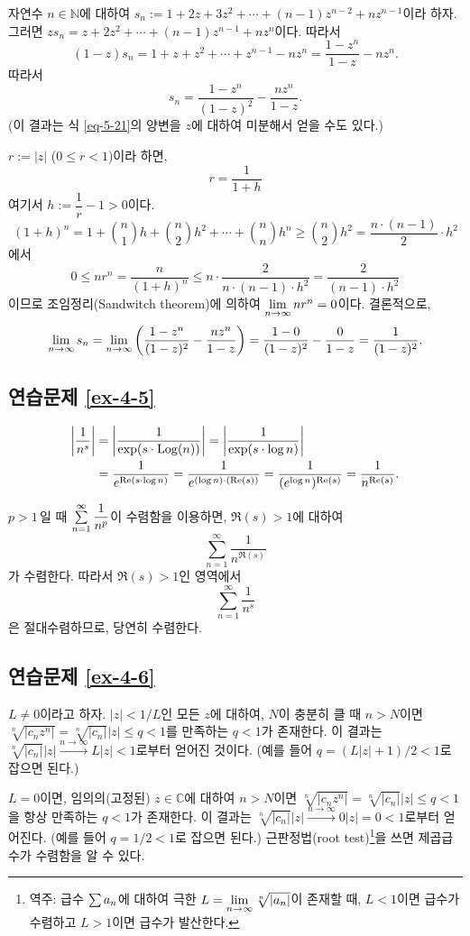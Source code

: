 자연수 $n\in\mathbb N$에 대하여 
$s_n:= 1+2z + 3z^2 + \cdots + (n-1)z^{n-2} + nz^{n-1}$이라 하자.
그러면 $zs_n = z + 2z^2 + \cdots + (n-1)z^{n-1} + nz^n$이다.
따라서
\[
(1-z)s_n= 1 + z + z^2 + \cdots + z^{n-1} - nz^n
= \dfrac{1-z^n}{1-z}  - nz^n.
\]
따라서
\[
s_n = \dfrac{1-z^n}{(1-z)^2}  - \dfrac{nz^n}{1-z}.
\]
(이 결과는 식 \eqref{eq-5-21}의 양변을 $z$에 대하여 미분해서 얻을 수도 있다.)

$r:=|z|$ ($0\le r < 1$)이라 하면,
\[
r = \dfrac1{1+h}
\]
여기서 $h:=\dfrac1r-1>0$이다.
\[
(1+h)^n = 1 + {n\choose 1}h + {n \choose 2}h^2 + \cdots
+ {n \choose n}h^n \ge {n \choose 2}h^2 = \dfrac{n\cdot(n-1)}2 \cdot h^2
\]
에서
\[
0\le nr^n = \dfrac n{(1+h)^n} \le n \cdot \dfrac2{n\cdot(n-1)\cdot h^2}
= \dfrac 2{(n-1)\cdot h^2}
\]
이므로
조임정리(Sandwitch theorem)에 의하여 $\lim\limits_{n\to\infty} nr^n = 0$이다.
결론적으로,
\[
\lim\limits_{n\to\infty}  s_n = \lim\limits_{n\to\infty} \left( \displaystyle\frac{1-z^n}{(1-z)^2}
- \displaystyle\frac{nz^n}{1-z} \right)
= \displaystyle\frac{1-0}{(1-z)^2} - \displaystyle\frac0{1-z} = \displaystyle\frac1{(1-z)^2}.
\]

\subsection*{연습문제 \ref{ex-4-5}}

\begin{align*}
\left| \displaystyle\frac1{n^s} \right| &= \left| \displaystyle\frac1{\exp(s\cdot \mathop{\mathrm{Log}}(n))} \right|
= \left| \displaystyle\frac1{\exp(s\cdot\log n)}\right| \\
&= \displaystyle\frac1{e^{\Re(s\cdot \log n)}} = \displaystyle\frac1{e^{(\log n)\cdot(\Re(s))}}
= \displaystyle\frac1{(e^{\log n})^{\Re(s)}} = \displaystyle\frac1{n^{\Re(s)}}.
\end{align*}

$p>1$\,일 때 $\sum\limits_{n=1}^\infty \displaystyle\frac1{n^p}$이 수렴함을 이용하면,
$\Re(s)>1$에 대하여
\[
\sum_{n=1}^\infty \dfrac1{n^{\Re(s)}}
\]
가 수렴한다. 따라서  $\Re(s)>1$인 영역에서
\[
\sum_{n=1}^\infty \dfrac1{n^{s}}
\]
은 절대수렴하므로, 당연히 수렴한다.

\subsection*{연습문제 \ref{ex-4-6}}

$L\ne0$이라고 하자.
$|z|< 1/L$인 모든 $z$에 대하여, 
$N$이 충분히 클 때 $n>N$이면
$\sqrt[n]{|c_nz^n|}  = \sqrt[n]{|c_n|}|z| \le q <1$를 만족하는 $q<1$가 존재한다. 
이 결과는 $\sqrt[n]{|c_n|}|z| \xrightarrow{n\to\infty} L|z|<1$로부터 얻어진 것이다.
(예를 들어 $q=(L|z|+1)/2 <1$로 잡으면 된다.)

$L=0$이면, 
임의의(고정된) $z\in \mathbb C$에 대하여
$n>N$이면 $\sqrt[n]{|c_nz^n|} = \sqrt[n]{|c_n|}|z| \le q < 1$을 항상 만족하는 $q<1$가 존재한다.
이 결과는  $\sqrt[n]{|c_n|}|z| \xrightarrow{n\to\infty} 0|z|=0<1$로부터 얻어진다.
(예를 들어 $q=1/2<1$로 잡으면 된다.)
근판정법(root test)\footnote{
역주:
급수 $\sum\limits a_n$에 대하여
극한 $L = \lim\limits_{n\to\infty} \sqrt[n]{|a_n|}$이 존재할 때,
$L<1$이면 급수가 수렴하고
$L>1$이면 급수가 발산한다.
}을 쓰면 제곱급수가 수렴함을 알 수 있다.

